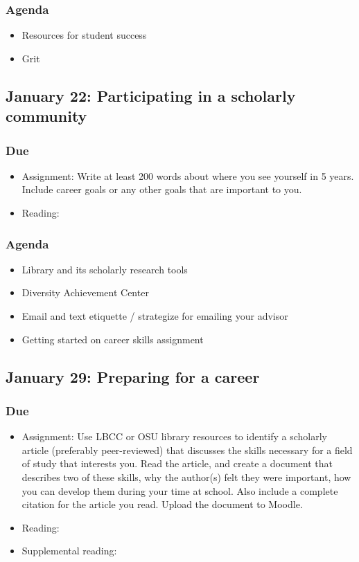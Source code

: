 \documentclass[12pt,article,oneside]{memoir}
\begin{document}
\subsubsection{Agenda}
\begin{itemize}
\item Resources for student success
\item Grit
\end{itemize} 








\subsection{January 22: Participating in a scholarly community}
\subsubsection{Due}
\begin{itemize}
 \item Assignment: Write at least 200 words about where you see yourself in 5 years.  Include career goals or any other goals that are important to you.
 \item Reading: \cite{wellsley}
\end{itemize}


\subsubsection{Agenda}
\begin{itemize}
 \item Library and its scholarly research tools
 \item Diversity Achievement Center
 \item Email and text etiquette / strategize for emailing your advisor
 \item Getting started on career skills assignment
\end{itemize}



\subsection{January 29: Preparing for a career}
\subsubsection{Due}
\begin{itemize}
 \item Assignment: Use LBCC or OSU library resources to identify a scholarly article (preferably peer-reviewed) that discusses the skills necessary for a field of study that interests you.  Read the article, and create a document that describes two of these skills, why the author(s) felt they were important, how you can develop them during your time at school. Also include a complete citation for the article you read.  Upload the document to Moodle.
 \item Reading: \cite{worksheets}
 \item Supplemental reading: \cite{crosswalk,ooh}
\end{itemize}
\end{document}
